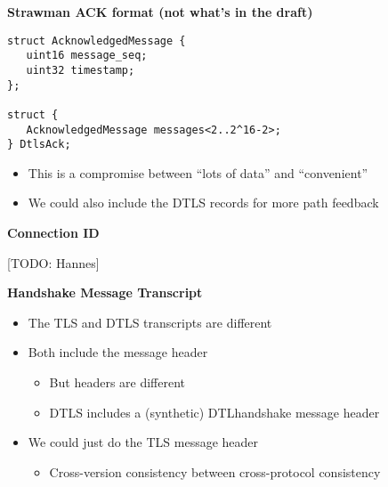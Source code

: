 \documentclass[helvetica]{seminar}
\newcommand{\heading}[1]{%
  \begin{center} 
    \large\bf 
    #1 
  \end{center} 
  \vspace{.4 in}}
\begin{document}
\begin{slide}
\heading{Strawman ACK format (not what's in the draft)}

{\small
\begin{verbatim}
struct AcknowledgedMessage {
   uint16 message_seq;
   uint32 timestamp; 
};

struct {
   AcknowledgedMessage messages<2..2^16-2>;
} DtlsAck;
\end{verbatim}
}

\begin{itemize}
\item This is a compromise between ``lots of data'' and ``convenient''
\item We could also include the DTLS records for more path feedback
\end{itemize}

\end{slide}


\begin{slide}
\heading{Connection ID}

[TODO: Hannes]
\end{slide}


\begin{slide}
\heading{Handshake Message Transcript}

\begin{itemize}
\item The TLS and DTLS transcripts are different
\item Both include the message header
  \begin{itemize}
  \item But headers are different
  \item DTLS includes a (synthetic) DTLhandshake message header
  \end{itemize}
\item We could just do the TLS message header
  \begin{itemize}
  \item Cross-version consistency between cross-protocol consistency
  \end{itemize}
\end{itemize}


\end{slide}
\end{document}
